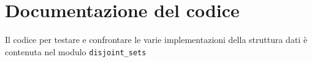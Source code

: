 \section{Documentazione del codice}
Il codice per testare e confrontare le varie implementazioni della struttura dati è
contenuta nel modulo \texttt{disjoint\_sets}